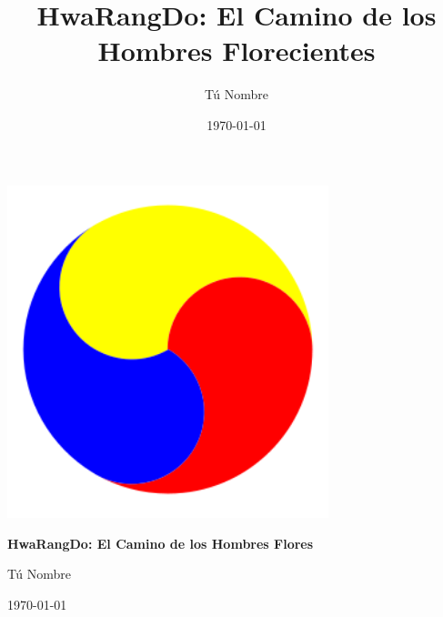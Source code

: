 \documentclass[a4paper,12pt]{book}
\title{HwaRangDo: El Camino de los Hombres Florecientes}
\author{Tú Nombre}
\date{\today}
\begin{document}
	\begin{titlepage}
		\centering
		\vspace*{\fill}
		\includegraphics[width=0.7\textwidth]{images/sam_taeguk.png} %
		\vspace*{\fill}

		\vspace*{2cm}

		{\Huge\bfseries HwaRangDo: El Camino de los Hombres Flores\par}
		\vspace{2cm}
		{\Large Tú Nombre\par}

		\vspace*{\fill}
		{\large \today\par}
	\end{titlepage}

	\tableofcontents

	\frontmatter %



	
	
\end{document}

